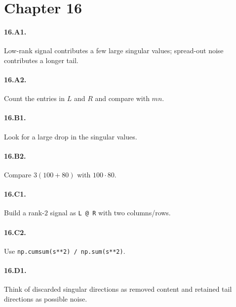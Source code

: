 \section*{Chapter 16}
\paragraph{16.A1.} Low-rank signal contributes a few large singular values;
spread-out noise contributes a longer tail.
\paragraph{16.A2.} Count the entries in $L$ and $R$ and compare with $mn$.
\paragraph{16.B1.} Look for a large drop in the singular values.
\paragraph{16.B2.} Compare $3(100+80)$ with $100\cdot 80$.
\paragraph{16.C1.} Build a rank-$2$ signal as \texttt{L @ R} with two
columns/rows.
\paragraph{16.C2.} Use \texttt{np.cumsum(s**2) / np.sum(s**2)}.
\paragraph{16.D1.} Think of discarded singular directions as removed content
and retained tail directions as possible noise.
